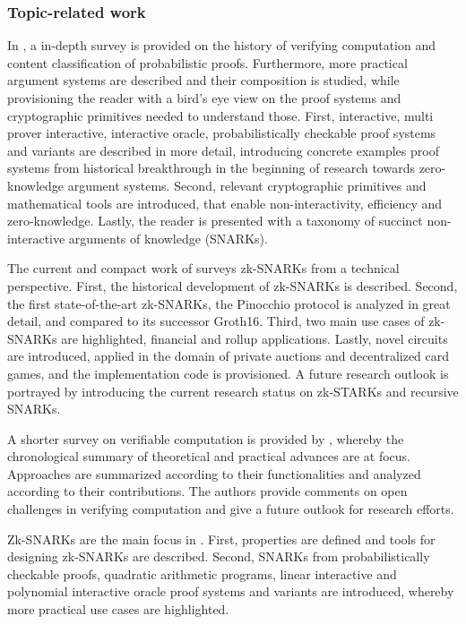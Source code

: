 \subsubsection{Topic-related work}
In \citet{Thaler}, a in-depth survey is provided on the history of verifying computation and content classification of probabilistic proofs. Furthermore, more practical argument systems are described and their composition is studied, while provisioning the reader with a bird's eye view on the proof systems and cryptographic primitives needed to understand those. First, interactive, multi prover interactive, interactive oracle, probabilistically checkable proof systems and variants are described in more detail, introducing concrete examples proof systems from historical breakthrough in the beginning of research towards zero-knowledge argument systems. Second, relevant cryptographic primitives and mathematical tools are introduced, that enable non-interactivity, efficiency and zero-knowledge. Lastly, the reader is presented with a taxonomy of succinct non-interactive arguments of knowledge (SNARKs).

The current and compact work of \citet{chen2022review} surveys zk-SNARKs from a technical perspective. First, the historical development of zk-SNARKs is described. Second, the first state-of-the-art zk-SNARKs, the Pinocchio protocol is analyzed in great detail, and compared to its successor Groth16. Third, two main use cases of zk-SNARKs are highlighted, financial and rollup applications. Lastly, novel circuits are introduced, applied in the domain of private auctions and decentralized card games, and the implementation code is provisioned. A future research outlook is portrayed by introducing the current research status on zk-STARKs and recursive SNARKs.

A shorter survey on verifiable computation is provided by \citet{Ahmad}, whereby the chronological summary of theoretical and practical advances are at focus. Approaches are summarized according to their functionalities and analyzed according to their contributions. The authors provide comments on open challenges in verifying computation and give a future outlook for research efforts. 

Zk-SNARKs are the main focus in \citet{NitulescuGentleIntroSNARKs}. First, properties are defined and tools for designing zk-SNARKs are described. Second, SNARKs from probabilistically checkable proofs, quadratic arithmetic programs, linear interactive and polynomial interactive oracle proof systems and variants are introduced, whereby more practical use cases are highlighted. 

